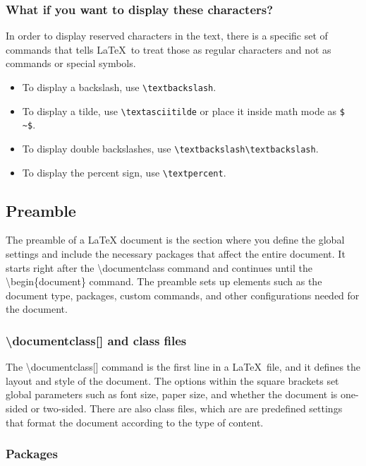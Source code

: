 \documentclass[12pt,journal,compsoc]{IEEEtran}
\begin{document}
\subsubsection{What if you want to display these characters?}

In order to display reserved characters in the text, there is a specific set of commands that tells \LaTeX\ to treat those as regular characters and not as commands or special symbols.

\begin{itemize}
    \item To display a backslash, use \texttt{\textbackslash textbackslash}.
    \item To display a tilde, use \texttt{\textbackslash textasciitilde} or place it inside math mode as \texttt{\$ \textasciitilde \$}.
    \item To display double backslashes, use \texttt{\textbackslash textbackslash\textbackslash textbackslash}.
    \item To display the percent sign, use \texttt{\textbackslash textpercent}.
\end{itemize}

\subsection{Preamble}

The preamble of a LaTeX document is the section where you define the global settings and include the necessary packages that affect the entire document. It starts right after the \textbackslash documentclass command and continues until the \textbackslash begin\{document\} command. The preamble sets up elements such as the document type, packages, custom commands, and other configurations needed for the document.

\subsubsection{\textbackslash documentclass[] and class files}

The \textbackslash documentclass[] command is the first line in a \LaTeX\ file, and it defines the layout and style of the document. The options within the square brackets set global parameters such as font size, paper size, and whether the document is one-sided or two-sided. There are also class files, which are are predefined settings that format the document according to the type of content. 

\subsubsection{Packages}
\end{document}
